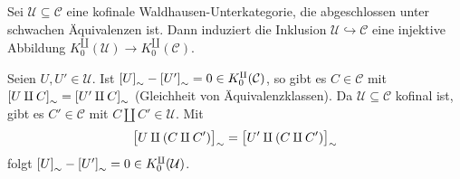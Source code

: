 \begin{lemma}
	Sei $\mathcal{U} \subseteq \mathcal{C}$ eine kofinale Waldhausen-Unterkategorie, die abgeschlossen unter schwachen Äquivalenzen ist.
	Dann induziert die Inklusion $\mathcal{U} \hookrightarrow \mathcal{C}$ eine injektive Abbildung $K_0^\amalg(\mathcal{U}) \to K_0^\amalg(\mathcal{C})$.
\end{lemma}
\begin{beweis}
	Seien $U,U' \in \mathcal{U}$.
	Ist $\benbrace*{U}_\sim - \benbrace*{U'}_\sim =0 \in K_0^\amalg(\mathcal{C})$, so gibt es $C \in \mathcal{C}$ mit $\benbrace*{U \amalg C}_\sim = \benbrace*{U' \amalg C}_\sim$ (Gleichheit von Äquivalenzklassen).
	Da $\mathcal{U} \subseteq \mathcal{C}$ kofinal ist, gibt es $C' \in \mathcal{C}$ mit $C \amalg C' \in \mathcal{U}$.
	Mit
	\[
		\benbrace[\big]{U \amalg (C \amalg C')}_\sim = \benbrace[\big]{U' \amalg (C \amalg C')}_\sim
	\]
	folgt $\benbrace*{U}_\sim - \benbrace*{U'}_\sim =0 \in K_0^\amalg(\mathcal{U})$.
\end{beweis}


